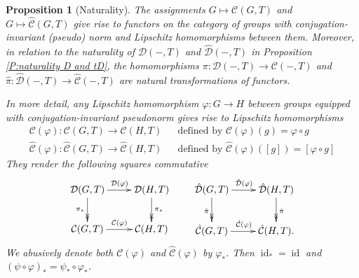 \documentclass[12pt]{amsart}
\newtheorem{prop}{Proposition}[section]
\theoremstyle{definition}
\def\vp{\varphi}
\newcommand{\C}[1]{\mathcal{#1}}
\newcommand{\OP}[1]{\operatorname{#1}}
\def\D{\mathcal{D}}
\def\tC{\hat{\mathcal{C}}}
\def\tD{\hat{\D}}
\begin{document}
\begin{prop}[Naturality] \label{P:naturality C and tC}
The assignments $G \mapsto \C C(G,T)$ and $G \mapsto \tC(G,T)$ give rise to functors on the category of groups with conjugation-invariant (pseudo) norm and Lipschitz homomorphisms between them.
Moreover, in relation to the naturality of $\C D(-,T)$ and $\tD(-,T)$ in Proposition \ref{P:naturality D and tD}, the homomorphisms $\pi \colon \C D(-,T) \to \C C(-,T)$ and $\hat{\pi} \colon \tD(-,T) \to \tC(-,T)$ are natural transformations of functors.

In more detail, any Lipschitz homomorphism $\varphi \colon G \to H$ between groups equipped with conjugation-invariant pseudonorm gives rise to Lipschitz homomorphisms 
\begin{align*}
\C C(\varphi) \colon \C C(G,T) \to \C C(H,T) & & \text{defined by } \C C(\varphi)(g) = \varphi \circ g 
\\
\tC(\varphi) \colon \tC(G,T) \to \tC(H,T) & & \text{defined by } \tC(\varphi)([g]) = [\varphi \circ g]
\end{align*}
%
They render the following squares commutative
\[
\xymatrix{
\C D(G,T) \ar[r]^{\C D(\varphi)} \ar@{->>}[d]_{\pi_*}
&
\C D(H,T) \ar@{->>}[d]^{\pi_*}
\\
\C C(G,T) \ar[r]^{\C C(\varphi)} &
\C C(H,T)
}
\qquad 
\xymatrix{
\tD(G,T) \ar[r]^{\tD(\varphi)} \ar@{->>}[d]_{\hat{\pi }}
&
\tD(H,T) \ar@{->>}[d]^{\hat{\pi}}
\\
\tC(G,T) \ar[r]^{\tC(\varphi)} &
\tC(H,T).
}
\]
We abusively denote both $\C C(\varphi)$ and $\tC(\varphi)$ by $\varphi_*$.
Then $\OP{id}_*=\OP{id}$ and $(\psi \circ \vp)_*=\psi_* \circ \vp_*$.
\end{prop}
\end{document}
